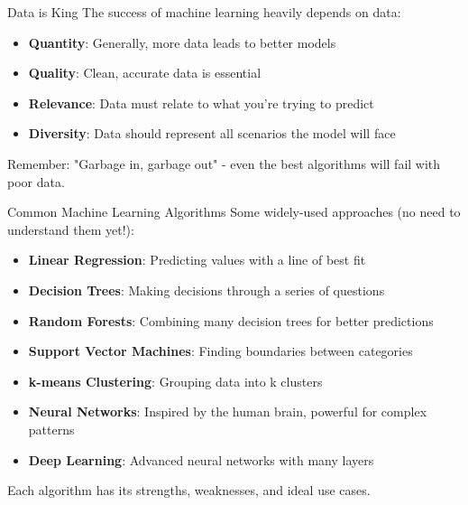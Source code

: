 \documentclass{beamer}
\begin{document}
\begin{frame}{Data is King}
  The success of machine learning heavily depends on data:
  
  \begin{itemize}
    \item \textbf{Quantity}: Generally, more data leads to better models
    \item \textbf{Quality}: Clean, accurate data is essential
    \item \textbf{Relevance}: Data must relate to what you're trying to predict
    \item \textbf{Diversity}: Data should represent all scenarios the model will face
  \end{itemize}
  
  \vspace{0.5cm}
  
  Remember: "Garbage in, garbage out" - even the best algorithms will fail with poor data.
\end{frame}

\begin{frame}{Common Machine Learning Algorithms}
  Some widely-used approaches (no need to understand them yet!):
  
  \begin{itemize}
    \item \textbf{Linear Regression}: Predicting values with a line of best fit
    \item \textbf{Decision Trees}: Making decisions through a series of questions
    \item \textbf{Random Forests}: Combining many decision trees for better predictions
    \item \textbf{Support Vector Machines}: Finding boundaries between categories
    \item \textbf{k-means Clustering}: Grouping data into k clusters
    \item \textbf{Neural Networks}: Inspired by the human brain, powerful for complex patterns
    \item \textbf{Deep Learning}: Advanced neural networks with many layers
  \end{itemize}
  
  Each algorithm has its strengths, weaknesses, and ideal use cases.
\end{frame}
\end{document}
